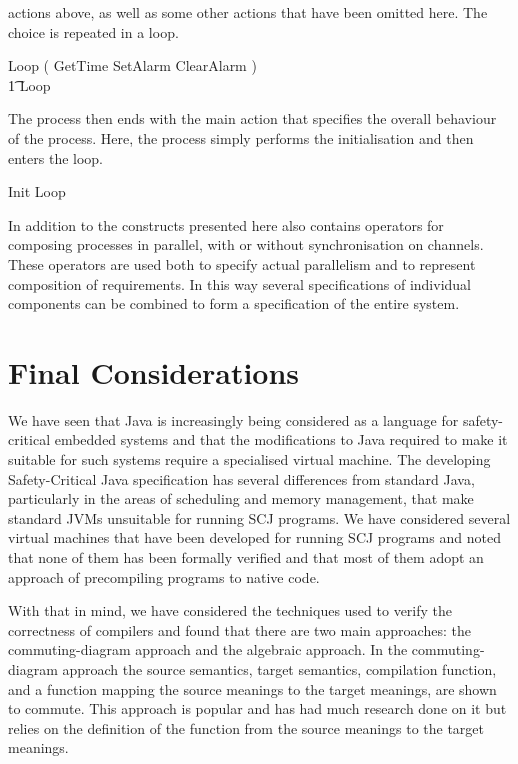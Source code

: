 \documentclass[a4paper,10pt]{report}
\begin{document}
actions above, as well as some other actions that have been omitted here. The
choice is repeated in a loop.
%
\begin{circusaction}
  Loop \circdef \left( GetTime \extchoice SetAlarm \extchoice ClearAlarm
    \extchoice \cdots \right) \\
  \t1 \circseq Loop
\end{circusaction}
%
The \Circus{} process then ends with the main action that specifies the overall
behaviour of the process. Here, the process simply performs the initialisation
and then enters the loop.
%
\begin{circusaction}
  \circspot Init \circseq Loop
\end{circusaction}
\begin{circus}
  \circend
\end{circus}

In addition to the constructs presented here \Circus{} also contains operators
for composing processes in parallel, with or without synchronisation on
channels.  These operators are used both to specify actual parallelism and to
represent composition of requirements.  In this way several \Circus{}
specifications of individual components can be combined to form a specification
of the entire system.


\section{Final Considerations}
\label{final-considerations-section}


We have seen that Java is increasingly being considered as a language for
safety-critical embedded systems and that the modifications to Java required to
make it suitable for such systems require a specialised virtual machine.  The
developing Safety-Critical Java specification has several differences from
standard Java, particularly in the areas of scheduling and memory management,
that make standard JVMs unsuitable for running SCJ programs.  We have considered
several virtual machines that have been developed for running SCJ programs and
noted that none of them has been formally verified and that most of them adopt
an approach of precompiling programs to native code.

With that in mind, we have considered the techniques used to verify the
correctness of compilers and found that there are two main approaches: the
commuting-diagram approach and the algebraic approach.  In the commuting-diagram
approach the source semantics, target semantics, compilation function, and a
function mapping the source meanings to the target meanings, are shown to
commute.  This approach is popular and has had much research done on it but
relies on the definition of the function from the source meanings to the target
meanings.
\end{document}
